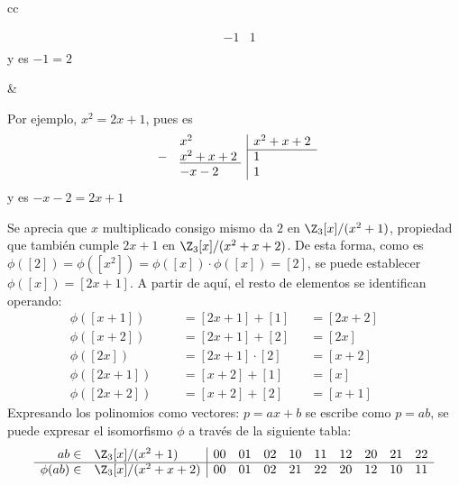 \begin{ejs}
\begin{center}
\begin{tabular}{cc}
\begin{minipage}[t]{0.4\textwidth}
\[\begin{array}{rl|l}
                        &-1& 1 \\
                    \end{array}
                    \]
                    y es $-1 = 2$
                \end{minipage}
                &
                \begin{minipage}[t]{0.4\textwidth}
                    \vspace{0.1em}
                    \centering
                    Por ejemplo, $x^2 =  2x + 1$, pues es\vspace{-0.2em}            
                    \[
                    \begin{array}{rl|l}
                        &x^2 & x^2 +x + 2\\\cline{3-3} 
                        - & \underline{x^2 + x+ 2\phantom{l}} & 1\\
                        &-x-2& 1 \\
                    \end{array}
                    \]
                    y es $-x-2 = 2x + 1$
                \end{minipage}
            \end{tabular}
        \end{center}
        
        Se aprecia que $x$ multiplicado consigo mismo da $2$ en $\Z_3[x]/(x^2 + 1)$, propiedad que también cumple $2x + 1$ en $\Z_3[x]/(x^2 +x + 2)$. De esta forma, como es $\phi([2]) =\phi([x^2]) =\phi([x]) \cdot \phi([x]) = [2]$, se puede establecer $\phi([x]) = [2x+1]$. A partir de aquí, el resto de elementos se identifican operando:
        \vspace{-0.5em}
        \begin{align*}
            &&&&\phi([x + 1]) &&&= [2x+1] + [1] &&= [2x+2]&& &&&&   \\
            &&&&\phi([x + 2]) &&&= [2x+1] + [2] &&= [2x]&&  &&&&    \\
            &&&&\phi([2x]) &&&= [2x+1] \cdot [2] &&= [x+2]&& &&&&   \\
            &&&&\phi([2x + 1]) &&&= [x+2] + [1] &&= [x]&&    &&&&   \\
           && &&\phi([2x + 2]) &&&= [x+2] + [2] &&= [x+1]&& &&&&
        \end{align*}
        Expresando los polinomios como vectores: $p = ax + b$ se escribe como $p = ab$, se puede expresar el isomorfismo $\phi$ a través de la siguiente tabla:        
        \[
            \begin{array}{rl|ccccccccc}
            ab \in &      \Z_3[x]/(x^2 + 1)    & 00&01&02&10&11&12&20&21&22 \\
            \hline
            \phi(ab) \in &  \Z_3[x]/(x^2 +x + 2) & 00&01&02&21&22&20&12&10&11
            \end{array}
        \]    


\end{ejs}
